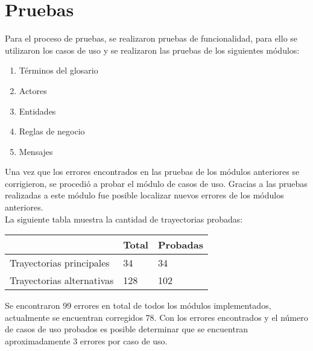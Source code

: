 \section{Pruebas}
Para el proceso de pruebas, se realizaron pruebas de funcionalidad, para ello se utilizaron los casos de uso y se realizaron las pruebas de los siguientes módulos:
\begin{enumerate}
 \item Términos del glosario
 \item Actores
 \item Entidades
 \item Reglas de negocio
 \item Mensajes
\end{enumerate}

Una vez que los errores encontrados en las pruebas de los módulos anteriores se corrigieron, se procedió a probar el módulo de casos de uso. Gracias a las pruebas realizadas a este módulo
fue posible localizar nuevos errores de los módulos anteriores. \\

La siguiente tabla muestra la cantidad de trayectorias probadas:


 \begin{longtable}{| p{} | p{} | p{} |}%
		\arrayrulecolor{black}%
		\rowcolor{black}%
		\color{white}  &  \color{white}Total & \color{white}Probadas\\ \hline
		\endhead%
		\arrayrulecolor{black}
		Trayectorias principales & 34 & 34\\ \hline 
		Trayectorias alternativas & 128 & 102\\ \hline
\end{longtable}

Se encontraron 99 errores en total de todos los módulos implementados, actualmente se encuentran corregidos 78.
Con los errores encontrados y el número de casos de uso probados es posible determinar que se encuentran aproximadamente 3 errores por caso de uso.\\